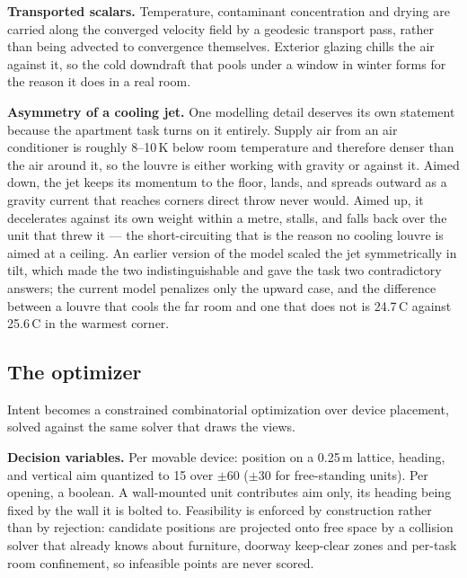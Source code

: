 \documentclass[manuscript,review,anonymous]{acmart}
\begin{document}
\textbf{Transported scalars.} Temperature, contaminant concentration and drying
are carried along the converged velocity field by a geodesic transport pass,
rather than being advected to convergence themselves. Exterior glazing chills
the air against it, so the cold downdraft that pools under a window in winter
forms for the reason it does in a real room.

\textbf{Asymmetry of a cooling jet.} One modelling detail deserves its own
statement because the apartment task turns on it entirely. Supply air from an
air conditioner is roughly 8--10\,K below room temperature and therefore denser
than the air around it, so the louvre is either working with gravity or against
it. Aimed down, the jet keeps its momentum to the floor, lands, and spreads
outward as a gravity current that reaches corners direct throw never would.
Aimed up, it decelerates against its own weight within a metre, stalls, and
falls back over the unit that threw it --- the short-circuiting that is the
reason no cooling louvre is aimed at a ceiling. An earlier version of the model
scaled the jet symmetrically in tilt, which made the two indistinguishable and
gave the task two contradictory answers; the current model penalizes only the
upward case, and the difference between a louvre that cools the far room and one
that does not is 24.7\,\textdegree C against 25.6\,\textdegree C in the warmest
corner.

\subsection{The optimizer}
\label{sec:optimizer}

Intent becomes a constrained combinatorial optimization over device placement,
solved against the same solver that draws the views.

\textbf{Decision variables.} Per movable device: position on a 0.25\,m lattice,
heading, and vertical aim quantized to 15\textdegree{} over $\pm$60\textdegree{}
($\pm$30\textdegree{} for free-standing units). Per opening, a boolean. A
wall-mounted unit contributes aim only, its heading being fixed by the wall it is
bolted to. Feasibility is enforced by construction rather than by rejection:
candidate positions are projected onto free space by a collision solver that
already knows about furniture, doorway keep-clear zones and per-task room
confinement, so infeasible points are never scored.
\end{document}
